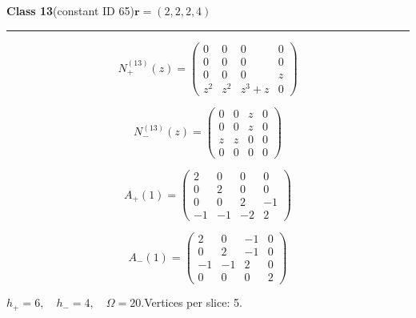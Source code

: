 \noindent\begin{minipage}{\linewidth}
\noindent\textbf{Class 13}\quad\small (constant ID 65)\hfill $\symbf{r}=(2,2,2,4)$
\par\smallskip\noindent\textcolor{rulegray}{\rule{\linewidth}{0.3pt}}
\begin{minipage}[c]{0.495\linewidth}\centering\fontsize{9.7}{12}\selectfont
\setlength{\abovedisplayskip}{4pt}\setlength{\belowdisplayskip}{4pt}
\setlength{\abovedisplayshortskip}{4pt}\setlength{\belowdisplayshortskip}{4pt}
\setlength{\arraycolsep}{3pt}\renewcommand{\arraystretch}{1.08}
\[N_{+}^{(13)}(z)=\begin{pmatrix}0 & 0 & 0 & 0\\0 & 0 & 0 & 0\\0 & 0 & 0 & z\\z^{2} & z^{2} & z^{3} + z & 0\end{pmatrix}\]
\end{minipage}%
\begin{minipage}[c]{0.495\linewidth}\centering\fontsize{9.7}{12}\selectfont
\setlength{\abovedisplayskip}{4pt}\setlength{\belowdisplayskip}{4pt}
\setlength{\abovedisplayshortskip}{4pt}\setlength{\belowdisplayshortskip}{4pt}
\setlength{\arraycolsep}{3pt}\renewcommand{\arraystretch}{1.08}
\[N_{-}^{(13)}(z)=\begin{pmatrix}0 & 0 & z & 0\\0 & 0 & z & 0\\z & z & 0 & 0\\0 & 0 & 0 & 0\end{pmatrix}\]
\end{minipage}%
\par\noindent
\begin{minipage}[c]{0.495\linewidth}\centering\fontsize{9.7}{12}\selectfont
\setlength{\abovedisplayskip}{4pt}\setlength{\belowdisplayskip}{4pt}
\setlength{\abovedisplayshortskip}{4pt}\setlength{\belowdisplayshortskip}{4pt}
\setlength{\arraycolsep}{3pt}\renewcommand{\arraystretch}{1.08}
\[A_{+}(1)=\begin{pmatrix}2 & 0 & 0 & 0\\0 & 2 & 0 & 0\\0 & 0 & 2 & -1\\-1 & -1 & -2 & 2\end{pmatrix}\]
\end{minipage}%
\begin{minipage}[c]{0.495\linewidth}\centering\fontsize{9.7}{12}\selectfont
\setlength{\abovedisplayskip}{4pt}\setlength{\belowdisplayskip}{4pt}
\setlength{\abovedisplayshortskip}{4pt}\setlength{\belowdisplayshortskip}{4pt}
\setlength{\arraycolsep}{3pt}\renewcommand{\arraystretch}{1.08}
\[A_{-}(1)=\begin{pmatrix}2 & 0 & -1 & 0\\0 & 2 & -1 & 0\\-1 & -1 & 2 & 0\\0 & 0 & 0 & 2\end{pmatrix}\]
\end{minipage}%
\par\smallskip\noindent\small $h_+=6,\quad h_-=4,\quad \Omega=20.$\quad Vertices per slice: 5.
\end{minipage}\par\vfill
